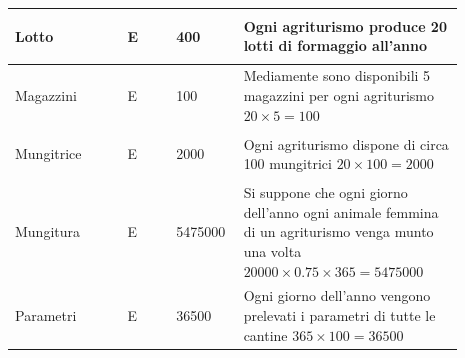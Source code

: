\documentclass[12pt,a4paper]{article}
\begin{document}
\begin{center}
\begin{longtable}{|p{0.23\linewidth}|p{0.1\linewidth}|p{0.11\linewidth}|p{0.45\linewidth}|}
\hline
Lotto 				& \begin{center}
\vspace{-25pt}E
\end{center}
					& \begin{center}
					\vspace{-25pt}400\end{center}
					&  Ogni agriturismo produce 20 lotti di formaggio all'anno \\ 

\hline
Magazzini 				& \begin{center}
\vspace{-25pt}E
\end{center}
					& \begin{center}
					\vspace{-25pt}100\end{center}
					&  Mediamente sono disponibili 5 magazzini per ogni agriturismo $20\times 5 = 100$ \\ 

\hline
Mungitrice 				& \begin{center}
\vspace{-25pt}E
\end{center}
					& \begin{center}
					\vspace{-25pt}2000\end{center}
					&  Ogni agriturismo dispone di circa 100 mungitrici $20\times 100= 2000$ \\ 

\hline
Mungitura 				& \begin{center}
\vspace{-25pt}E
\end{center}
					& \begin{center}
					\vspace{-25pt}5475000\end{center}
					&  Si suppone che ogni giorno dell'anno ogni animale femmina di un agriturismo venga munto una volta $20000\times 0.75 \times 365 = 5475000$ \\ 

\hline
Parametri 				& \begin{center}
\vspace{-25pt}E
\end{center}
					& \begin{center}
					\vspace{-25pt}36500\end{center}
					&  Ogni giorno dell'anno vengono prelevati i parametri di tutte le cantine $365\times 100= 36500$ \\ 


\end{longtable}
\end{center}
\end{document}
